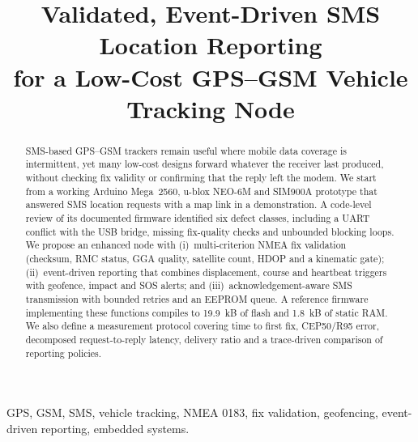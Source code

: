 \documentclass[conference]{IEEEtran}
\begin{document}
\title{Validated, Event-Driven SMS Location Reporting\\for a Low-Cost GPS--GSM Vehicle Tracking Node}

\author{
\and
{}
}

\maketitle

\begin{abstract}
SMS-based GPS--GSM trackers remain useful where mobile data coverage is intermittent, yet many low-cost designs forward whatever the receiver last produced, without checking fix validity or confirming that the reply left the modem. We start from a working Arduino Mega~2560, u-blox NEO-6M and SIM900A prototype that answered SMS location requests with a map link in a demonstration. A code-level review of its documented firmware identified six defect classes, including a UART conflict with the USB bridge, missing fix-quality checks and unbounded blocking loops. We propose an enhanced node with (i)~multi-criterion NMEA fix validation (checksum, RMC status, GGA quality, satellite count, HDOP and a kinematic gate); (ii)~event-driven reporting that combines displacement, course and heartbeat triggers with geofence, impact and SOS alerts; and (iii)~acknowledgement-aware SMS transmission with bounded retries and an EEPROM queue. A reference firmware implementing these functions compiles to 19.9~kB of flash and 1.8~kB of static RAM. We also define a measurement protocol covering time to first fix, CEP50/R95 error, decomposed request-to-reply latency, delivery ratio and a trace-driven comparison of reporting policies.
\end{abstract}

\begin{IEEEkeywords}
GPS, GSM, SMS, vehicle tracking, NMEA 0183, fix validation, geofencing, event-driven reporting, embedded systems.
\end{IEEEkeywords}
\end{document}
